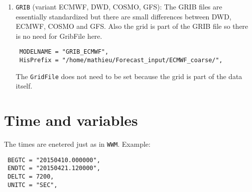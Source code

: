 \documentclass[12pt]{amsart}
\begin{document}
\begin{enumerate}
{\tt ROMS} is for normal ROMS output, {\tt ROMS\_output\_0001.nc}, etc. {\tt ROMS\_IVICA} is for files by date {\tt ROMS\_output\_20140101.nc}, etc.
\item {\tt GRIB} (variant ECMWF, DWD, COSMO, GFS): The GRIB files are essentially standardized but there are small differences between DWD, ECMWF, COSMO and GFS. Also the grid is part of the GRIB file so there is no need for GribFile here.
\begin{verbatim}
 MODELNAME = "GRIB_ECMWF", 
 HisPrefix = "/home/mathieu/Forecast_input/ECMWF_coarse/", 
\end{verbatim}
The {\tt GridFile} does not need to be set because the grid is part of the data itself.

\end{enumerate}


\section{Time and variables}

The times are enetered just as in {\tt WWM}.
Example:
\begin{verbatim}
 BEGTC = "20150410.000000",
 ENDTC = "20150421.120000",
 DELTC = 7200, 
 UNITC = "SEC", 
\end{verbatim}
\end{document}
